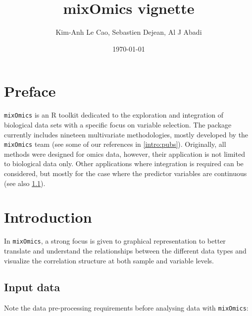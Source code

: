 \documentclass[]{book}
\title{mixOmics vignette}
\author{Kim-Anh Le Cao, Sebastien Dejean, Al J Abadi}
\date{\today}
\begin{document}
\maketitle

{
\setcounter{tocdepth}{1}
\tableofcontents
}
\hypertarget{preface}{%
\chapter*{Preface}\label{preface}}

\texttt{mixOmics} is an R toolkit dedicated to the exploration and integration of biological data sets with a specific focus on variable selection. The package currently includes nineteen multivariate methodologies, mostly developed by the \texttt{mixOmics} team (see some of our references in \ref{intro:pubs}). Originally, all methods were designed for omics data, however, their application is not limited to biological data only. Other applications where integration is required can be considered, but mostly for the case where the predictor variables are continuous (see also \ref{intro:datatypes}).

\hypertarget{intro}{%
\chapter{Introduction}\label{intro}}

In \texttt{mixOmics}, a strong focus is given to graphical representation to better translate and understand the relationships between the different data types and visualize the correlation structure at both sample and variable levels.

\hypertarget{intro:datatypes}{%
\section{Input data}\label{intro:datatypes}}

Note the data pre-processing requirements before analysing data with \texttt{mixOmics}:
\end{document}
